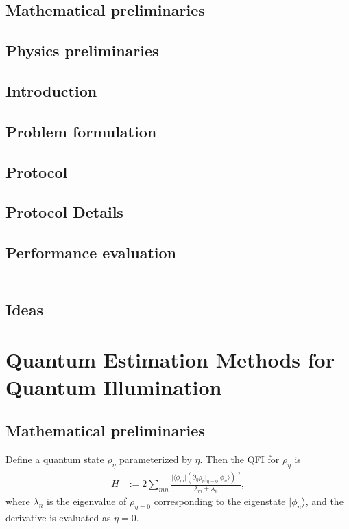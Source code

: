 \documentclass[../../note.tex]{subfiles}
\begin{document}
\subsection{Mathematical preliminaries}


\subsection{Physics preliminaries}


\subsection{Introduction}


\subsection{Problem formulation}


\subsection{Protocol}


\subsection{Protocol Details}


\subsection{Performance evaluation}

\begin{lemma}
    \begin{align}
    \end{align}
\end{lemma}

\subsection{Ideas}

\section{Quantum Estimation Methods for Quantum Illumination \cite{sanz2017quantum}}
\subsection{Mathematical preliminaries}
\begin{definition}
    \label{dfe: qfi}
    Define a quantum state $\rho_{\eta}$ parameterized by $\eta$. Then the QFI for $\rho_{\eta}$ is
    \begin{align}
        H
        &:= 2 \sum_{mn} \frac{\vert \langle \phi_m \vert (\partial_{\eta}\rho_{\eta}\vert_{\eta=0}\vert \phi_{n}\rangle)\vert^2}{\lambda_m + \lambda_n},
    \end{align}
    where $\lambda_n$ is the eigenvalue of $\rho_{\eta=0}$ corresponding to the eigenstate $\vert \phi_n \rangle$, and the derivative is evaluated as $\eta=0$.
\end{definition}
\end{document}
